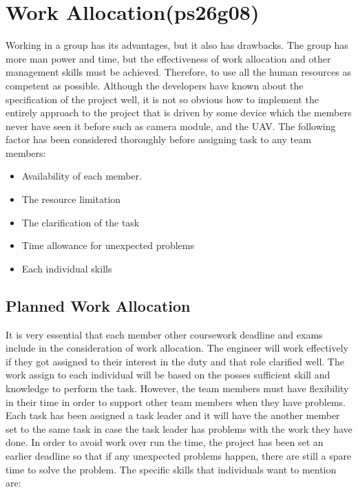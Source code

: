 \section{Work Allocation(ps26g08)}

Working in a group has its advantages, but it also has drawbacks. The group has more man power and time, but the effectiveness of work allocation and other management skills must be achieved. Therefore, to use all the human resources as competent as possible. Although the developers have known about the specification of the project well, it is not so obvious how to implement the entirely approach to the project that is driven by some device which the members never have seen it before such as camera module, and the UAV. The following factor has been considered thoroughly before assigning task to any team members:

\begin{itemize}
\item	Availability of each member.

\item	The resource limitation
 
\item	The clarification of the task

\item   Time allowance for unexpected problems

\item	Each individual skills
\end{itemize}


\subsection{Planned Work Allocation}
 It is very essential that each member other coursework deadline and exams include in the consideration of work allocation. 
The engineer will work effectively if they got assigned  to their interest in the duty and that role clarified well. The work assign to each individual will be based on the posses sufficient skill and knowledge to perform the task. However, the team members must have flexibility in their time in order to support other team members when they have problems. Each task has been assigned a task leader and it will have the another member set to the same task in case the task leader has problems with the work they have done. In order to avoid work over run the time, the project has been set an earlier deadline so that if any unexpected problems happen, there are still a spare time to solve the problem. The specific skills that individuals want to mention are:

